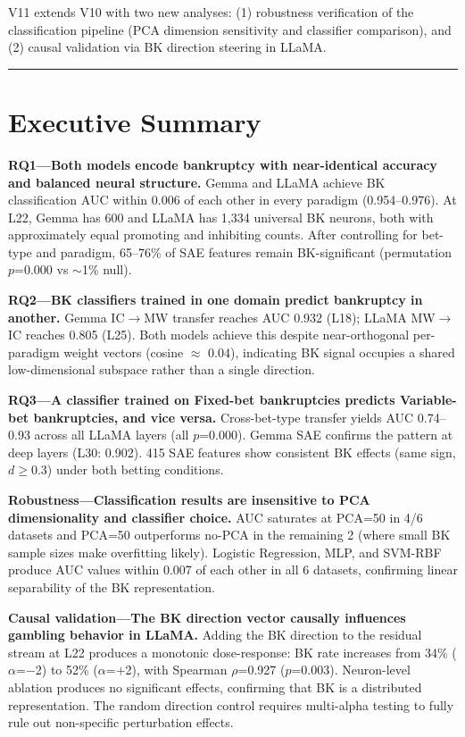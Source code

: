 \documentclass[11pt,a4paper]{article}
\begin{document}
V11 extends V10 with two new analyses: (1) robustness verification of the classification pipeline (PCA dimension sensitivity and classifier comparison), and (2) causal validation via BK direction steering in LLaMA.

\bigskip\hrule\bigskip

\section*{Executive Summary}

\textbf{RQ1---Both models encode bankruptcy with near-identical accuracy and balanced neural structure.} Gemma and LLaMA achieve BK classification AUC within 0.006 of each other in every paradigm (0.954--0.976). At L22, Gemma has 600 and LLaMA has 1{,}334 universal BK neurons, both with approximately equal promoting and inhibiting counts. After controlling for bet-type and paradigm, 65--76\% of SAE features remain BK-significant (permutation $p$=0.000 vs ${\sim}$1\% null).

\textbf{RQ2---BK classifiers trained in one domain predict bankruptcy in another.} Gemma IC$\rightarrow$MW transfer reaches AUC 0.932 (L18); LLaMA MW$\rightarrow$IC reaches 0.805 (L25). Both models achieve this despite near-orthogonal per-paradigm weight vectors (cosine $\approx$ 0.04), indicating BK signal occupies a shared low-dimensional subspace rather than a single direction.

\textbf{RQ3---A classifier trained on Fixed-bet bankruptcies predicts Variable-bet bankruptcies, and vice versa.} Cross-bet-type transfer yields AUC 0.74--0.93 across all LLaMA layers (all $p$=0.000). Gemma SAE confirms the pattern at deep layers (L30: 0.902). 415 SAE features show consistent BK effects (same sign, $d$$\geq$0.3) under both betting conditions.

\textbf{Robustness---Classification results are insensitive to PCA dimensionality and classifier choice.} AUC saturates at PCA=50 in 4/6 datasets and PCA=50 outperforms no-PCA in the remaining 2 (where small BK sample sizes make overfitting likely). Logistic Regression, MLP, and SVM-RBF produce AUC values within 0.007 of each other in all 6 datasets, confirming linear separability of the BK representation.

\textbf{Causal validation---The BK direction vector causally influences gambling behavior in LLaMA.} Adding the BK direction to the residual stream at L22 produces a monotonic dose-response: BK rate increases from 34\% ($\alpha$=$-$2) to 52\% ($\alpha$=$+$2), with Spearman $\rho$=0.927 ($p$=0.003). Neuron-level ablation produces no significant effects, confirming that BK is a distributed representation. The random direction control requires multi-alpha testing to fully rule out non-specific perturbation effects.
\end{document}
